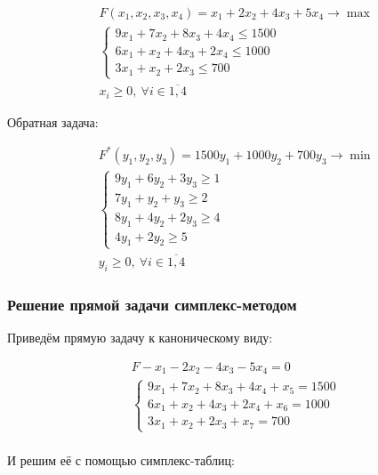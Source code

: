 \begin{align*}
    &F(x_{ 1}, x_{ 2}, x_{ 3} , x_{ 4}) = x_{ 1} + 2x_{ 2} + 4x_{ 3} + 5x_4 \to \max\\
    &\begin{cases}
        9x_1 + 7x_2 + 8x_3 + 4x_4 \leq 1500\\
        6x_1 + x_2 + 4x_3 + 2x_4 \leq 1000\\
        3x_1 + x_2 + 2x_3 \leq 700
    \end{cases}\\
    &x_i \geq 0, \ \forall i\in\overline{1,4}
\end{align*}

Обратная задача:

\begin{align*}
    &F^{ *}(y_{ 1}, y_{ 2}, y_{ 3}) = 1500y_{ 1} + 1000y_{ 2} + 700y_{ 3} \to \min\\
    &\begin{cases}
        9y_1 + 6y_2 + 3y_3 \geq 1\\
        7y_1 + y_2 + y_3 \geq 2\\
        8y_1 + 4y_2 + 2y_3 \geq 4\\
        4y_1 + 2y_2 \geq 5
    \end{cases}\\
    &y_i \geq 0, \ \forall i\in\overline{1,4}
\end{align*}

\subsubsection{Решение прямой задачи симплекс-методом}

Приведём прямую задачу к каноническому виду:

\begin{align*}
    &F - x_{ 1} - 2x_{ 2} - 4x_{ 3} - 5x_4 = 0\\
    &\begin{cases}
        9x_1 + 7x_2 + 8x_3 + 4x_4 + x_5 = 1500\\
        6x_1 + x_2 + 4x_3 + 2x_4 + x_6 = 1000\\
        3x_1 + x_2 + 2x_3 + x_7 = 700
    \end{cases}\\
\end{align*}

И решим её с помощью симплекс-таблиц:

